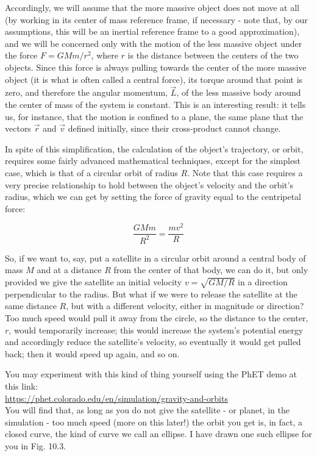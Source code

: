 \documentclass[10pt]{article}
\begin{document}
Accordingly, we will assume that the more massive object does not move at all (by working in its center of mass reference frame, if necessary - note that, by our assumptions, this will be an inertial reference frame to a good approximation), and we will be concerned only with the motion of the less massive object under the force $F=G M m / r^{2}$, where $r$ is the distance between the centers of the two objects. Since this force is always pulling towards the center of the more massive object (it is what is often called a central force), its torque around that point is zero, and therefore the angular momentum, $\vec{L}$, of the less massive body around the center of mass of the system is constant. This is an interesting result: it tells us, for instance, that the motion is confined to a plane, the same plane that the vectors $\vec{r}$ and $\vec{v}$ defined initially, since their cross-product cannot change.

In spite of this simplification, the calculation of the object's trajectory, or orbit, requires some fairly advanced mathematical techniques, except for the simplest case, which is that of a circular orbit of radius $R$. Note that this case requires a very precise relationship to hold between the object's velocity and the orbit's radius, which we can get by setting the force of gravity equal to the centripetal force:


\begin{equation*}
\frac{G M m}{R^{2}}=\frac{m v^{2}}{R} \tag{10.11}
\end{equation*}


So, if we want to, say, put a satellite in a circular orbit around a central body of mass $M$ and at a distance $R$ from the center of that body, we can do it, but only provided we give the satellite an initial velocity $v=\sqrt{G M / R}$ in a direction perpendicular to the radius. But what if we were to release the satellite at the same distance $R$, but with a different velocity, either in magnitude or direction? Too much speed would pull it away from the circle, so the distance to the center, $r$, would temporarily increase; this would increase the system's potential energy and accordingly reduce the satellite's velocity, so eventually it would get pulled back; then it would speed up again, and so on.

You may experiment with this kind of thing yourself using the PhET demo at this link:\\
\href{https://phet.colorado.edu/en/simulation/gravity-and-orbits}{https://phet.colorado.edu/en/simulation/gravity-and-orbits}\\
You will find that, as long as you do not give the satellite - or planet, in the simulation - too much speed (more on this later!) the orbit you get is, in fact, a closed curve, the kind of curve we call an ellipse. I have drawn one such ellipse for you in Fig. 10.3.
\end{document}
